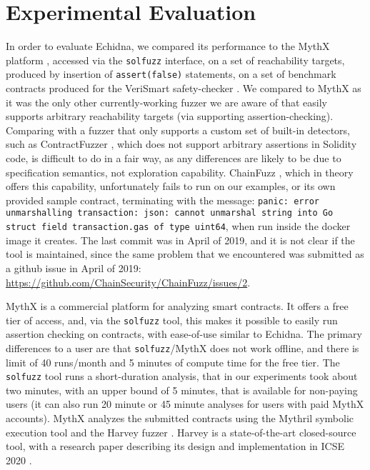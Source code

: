 \section{Experimental Evaluation}

In order to evaluate Echidna, we compared its performance to the MythX platform \cite{mythx}, accessed via the {\tt solfuzz} \cite{solfuzz} interface, on a set of reachability targets, produced by insertion of {\tt assert(false)} statements, on a set of benchmark contracts \cite{vsbenchmark} produced for the VeriSmart safety-checker \cite{VeriSmart}.  We compared to MythX as it was the only other currently-working fuzzer we are aware of that easily supports arbitrary reachability targets (via supporting assertion-checking).  Comparing with a fuzzer that only supports a custom set of built-in detectors, such as ContractFuzzer \cite{contractfuzzer}, which does not support arbitrary assertions in Solidity code, is difficult to do in a fair way, as any differences are likely to be due to specification semantics, not exploration capability.  ChainFuzz \cite{chainfuzz}, which in theory offers this capability, unfortunately fails to run on our examples, or its own provided sample contract, terminating with the message: {\tt panic: error unmarshalling transaction: json: cannot unmarshal string into Go struct field transaction.gas of type uint64}, when run inside the docker image it creates.  The last commit was in April of 2019, and it is not clear if the tool is maintained, since the same problem that we encountered was submitted as a github issue in April of 2019:  \url{https://github.com/ChainSecurity/ChainFuzz/issues/2}.

MythX is a commercial platform for analyzing smart contracts.  It offers a free tier of access, and, via the {\tt solfuzz} tool, this makes it possible to easily run assertion checking on contracts, with ease-of-use similar to Echidna.  The primary differences to a user are that {\tt solfuzz}/MythX does not work offline, and there is limit of 40 runs/month and 5 minutes of compute time for the free tier.  The {\tt solfuzz} tool runs a short-duration analysis, that in our experiments took about two minutes, with an upper bound of 5 minutes, that is available for non-paying users (it can also run 20 minute or 45 minute analyses for users with paid MythX accounts).  MythX analyzes the submitted contracts using the Mythril symbolic execution tool \cite{mythril-code} and the Harvey fuzzer \cite{harvey}.  Harvey is a state-of-the-art closed-source tool, with a research paper describing its design and implementation in ICSE 2020 \cite{harvey}.

